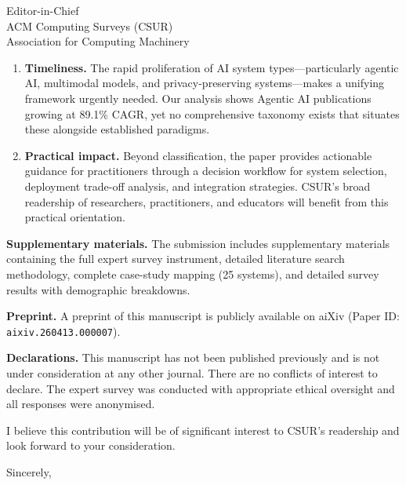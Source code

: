 \documentclass[11pt]{letter}
\begin{document}
\begin{letter}{%
  Editor-in-Chief\\
  ACM Computing Surveys (CSUR)\\
  Association for Computing Machinery}
\begin{enumerate}
  \item \textbf{Timeliness.} The rapid proliferation of AI system types---particularly agentic AI, multimodal models, and privacy-preserving systems---makes a unifying framework urgently needed. Our analysis shows Agentic AI publications growing at 89.1\% CAGR, yet no comprehensive taxonomy exists that situates these alongside established paradigms.

  \item \textbf{Practical impact.} Beyond classification, the paper provides actionable guidance for practitioners through a decision workflow for system selection, deployment trade-off analysis, and integration strategies. CSUR's broad readership of researchers, practitioners, and educators will benefit from this practical orientation.
\end{enumerate}

\textbf{Supplementary materials.} The submission includes supplementary materials containing the full expert survey instrument, detailed literature search methodology, complete case-study mapping (25 systems), and detailed survey results with demographic breakdowns.

\textbf{Preprint.} A preprint of this manuscript is publicly available on aiXiv (Paper ID: \texttt{aixiv.260413.000007}).

\textbf{Declarations.} This manuscript has not been published previously and is not under consideration at any other journal. There are no conflicts of interest to declare. The expert survey was conducted with appropriate ethical oversight and all responses were anonymised.

I believe this contribution will be of significant interest to CSUR's readership and look forward to your consideration.

\closing{Sincerely,}

\end{letter}
\end{document}
